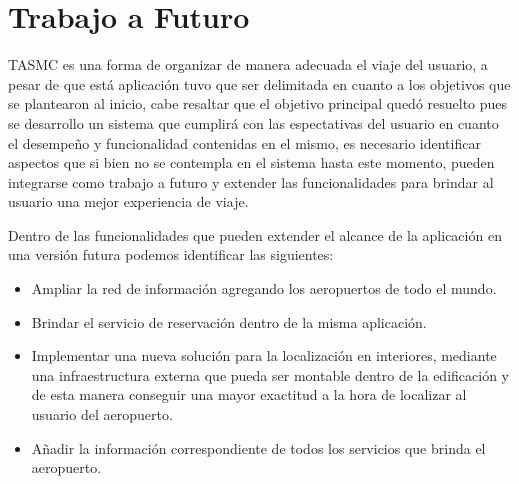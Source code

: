 \chapter*{Trabajo a Futuro} %


TASMC es una forma de organizar de manera adecuada el viaje del usuario, a pesar de que está aplicación tuvo que ser delimitada en  
cuanto a los objetivos que se plantearon al inicio, cabe resaltar que el objetivo principal quedó resuelto pues se desarrollo un sistema
que cumplirá con las espectativas del usuario en cuanto el desempeño y funcionalidad contenidas en el mismo, es necesario identificar aspectos 
que si bien no se contempla en el sistema hasta este momento, pueden integrarse como trabajo a futuro y extender las funcionalidades 
para brindar al usuario una mejor experiencia de viaje.

Dentro de las funcionalidades que pueden extender el alcance de la aplicación en una versión futura podemos identificar las 
siguientes: 

\begin{itemize}
 \item Ampliar la red de información agregando los aeropuertos de todo el mundo.
 \item Brindar el servicio de reservación dentro de la misma aplicación.
 \item Implementar una nueva solución para la localización en interiores, mediante una infraestructura externa que pueda ser montable dentro de la edificación y de esta manera conseguir una mayor exactitud a la hora de localizar al usuario del aeropuerto.
 \item Añadir la información correspondiente de todos los servicios que brinda el aeropuerto.
\end{itemize}
